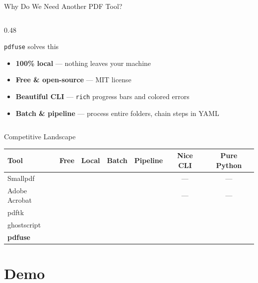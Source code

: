 \documentclass[aspectratio=169]{beamer}
\newcommand{\cmark}{\textcolor{pdfgreen}{\ding{51}}}
\newcommand{\xmark}{\textcolor{pdfred}{\ding{55}}}
\begin{document}
\begin{frame}{Why Do We Need Another PDF Tool?}
\begin{columns}[T]
\begin{column}{0.48\textwidth}
\begin{block}{\texttt{pdfuse} solves this}
\begin{itemize}
          \item[\cmark] \textbf{100\% local} --- nothing leaves your machine
          \vspace{4pt}
          \item[\cmark] \textbf{Free \& open-source} --- MIT license
          \vspace{4pt}
          \item[\cmark] \textbf{Beautiful CLI} --- \texttt{rich} progress
                        bars and colored errors
          \vspace{4pt}
          \item[\cmark] \textbf{Batch \& pipeline} --- process entire
                        folders, chain steps in YAML
        \end{itemize}
      \end{block}
    \end{column}
  \end{columns}
\end{frame}

\begin{frame}{Competitive Landscape}
  \centering
  \renewcommand{\arraystretch}{1.4}
  \begin{tabular}{lcccccc}
    \toprule
    \textbf{Tool} &
    \textbf{Free} &
    \textbf{Local} &
    \textbf{Batch} &
    \textbf{Pipeline} &
    \textbf{Nice CLI} &
    \textbf{Pure Python} \\
    \midrule
    Smallpdf        & \xmark & \xmark & \xmark & \xmark & ---    & ---    \\
    Adobe Acrobat   & \xmark & \cmark & \xmark & \xmark & ---    & ---    \\
    pdftk           & \cmark & \cmark & \xmark & \xmark & \xmark & \xmark \\
    ghostscript     & \cmark & \cmark & \xmark & \xmark & \xmark & \xmark \\
    \midrule
    \rowcolor{highlight}
    \textbf{pdfuse} & \cmark & \cmark & \cmark & \cmark & \cmark & \cmark \\
    \bottomrule
  \end{tabular}
\end{frame}

\section{Demo}
\end{document}
